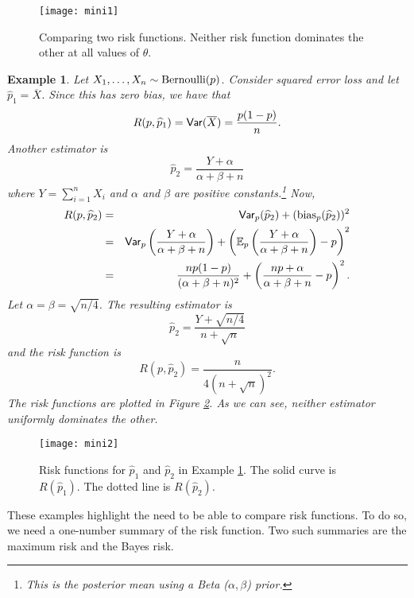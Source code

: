 \documentclass[twoside,12pt]{article}
\newcommand{\V}{\mbox{${\sf Var}$}}
\newtheorem{example}[theorem]{Example}
\newcommand\E{\mathbb{E}}
\begin{document}
\begin{figure}
\begin{center}
\texttt{[image: mini1]}
\end{center}
\vspace{-8.5in}
\caption{Comparing two risk functions. Neither risk function dominates
the other at all values of $\theta$.}
\label{fig::two-risk-functions}
\end{figure}

\begin{example}\label{ex::binomial-risk}
Let $X_1, \ldots, X_n \sim {\rm Bernoulli}(p)$.
Consider squared error loss and
let $\widehat{p}_1=\overline{X}$.
Since this has zero bias, we have that
$$
R(p,\widehat{p}_1) = \V(\overline{X}) = \frac{ p(1-p)}{n}.
$$
Another estimator is
$$
\widehat{p}_2 = \frac{Y + \alpha}{\alpha+\beta+n}
$$
where
$Y = \sum_{i=1}^n X_i$ and
$\alpha$ and $\beta$ are positive constants.\footnote{{\sf
This is the posterior mean using a {\rm Beta} ($\alpha,\beta$) prior.}}
Now,
\begin{eqnarray*}
R(p,\widehat{p}_2) &=&
\V_p (\widehat{p}_2) + ({\rm bias}_p(\widehat{p}_2))^2 \\
&=&
\V_p\left( \frac{Y+\alpha}{\alpha+\beta+n}\right) +
\left( \E_p \left( \frac{Y+\alpha}{\alpha+\beta+n}\right) -p\right)^2\\
&=&
\frac{n p (1-p)}{ (\alpha + \beta +n)^2} +
\left( \frac{n p + \alpha}{\alpha+\beta+n}-p\right)^2.
\end{eqnarray*}
Let $\alpha =\beta = \sqrt{n/4}$.
The resulting 
estimator is
$$
\widehat{p}_2 = \frac{Y + \sqrt{n/4}}{n+ \sqrt{n}}
$$
and the risk function is
$$
R(p,\widehat{p}_2) = \frac{n}{ 4(n+ \sqrt{n})^2}.
$$
The risk functions are plotted in Figure \ref{fig::bin-risk}.
As we can see, neither estimator uniformly dominates the other.
\end{example}

\begin{figure}
\begin{center}
\texttt{[image: mini2]}
\end{center}
\vspace{-8in}
\caption{Risk functions for $\widehat{p}_1$ and $\widehat{p}_2$ 
in Example \ref{ex::binomial-risk}.
The solid curve is $R(\widehat{p}_1)$.
The dotted line is $R(\widehat{p}_2)$.}
\label{fig::bin-risk}
\end{figure}

These examples highlight the need to be able to 
compare risk functions.
To do so, we need a one-number summary of the risk
function.
Two such summaries are
the maximum risk
and
the Bayes risk.
\end{document}
